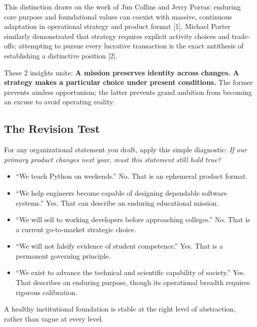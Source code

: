 This distinction draws on the work of Jim Collins and Jerry Porras: enduring core purpose and foundational values can coexist with massive, continuous adaptation in operational strategy and product format [1]. Michael Porter similarly demonstrated that strategy requires explicit activity choices and trade-offs; attempting to pursue every lucrative transaction is the exact antithesis of establishing a distinctive position [2].

These 2 insights unite: \textbf{A mission preserves identity across changes. A strategy makes a particular choice under present conditions.} The former prevents aimless opportunism; the latter prevents grand ambition from becoming an excuse to avoid operating reality.

\subsection{The Revision Test}

For any organizational statement you draft, apply this simple diagnostic: \textit{If our primary product changes next year, must this statement still hold true?}

\begin{itemize}[leftmargin=11pt,itemsep=1.5pt,topsep=1.5pt,parsep=0pt]
  \item ``We teach Python on weekends.'' No. That is an ephemeral product format.
  \item ``We help engineers become capable of designing dependable software systems.'' Yes. That can describe an enduring educational mission.
  \item ``We will sell to working developers before approaching colleges.'' No. That is a current go-to-market strategic choice.
  \item ``We will not falsify evidence of student competence.'' Yes. That is a permanent governing principle.
  \item ``We exist to advance the technical and scientific capability of society.'' Yes. That describes an enduring purpose, though its operational breadth requires rigorous calibration.
\end{itemize}

A healthy institutional foundation is stable at the right level of abstraction, rather than vague at every level.
